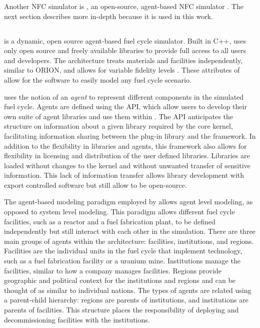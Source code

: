 Another \gls{NFC} simulator is \Cyclus, an open-source, agent-based 
\gls{NFC} simulator \cite{huff_fundamental_2016}. The next section 
describes \Cyclus more in-depth because it is used in this work.  

\subsection{\Cyclus}
\Cyclus is a dynamic, open source agent-based fuel cycle simulator. Built 
in C++, \Cyclus uses only open source and freely available libraries to 
provide full access to all users and developers. The 
\Cyclus architecture treats materials and facilities independently, similar 
to ORION, and allows 
for variable fidelity levels \cite{huff_fundamental_2016}. These attributes
of \Cyclus allow for the software to easily model any fuel cycle scenario.

\Cyclus uses the notion of an \textit{agent} to represent different 
components in the simulated fuel cycle. Agents are 
defined using the \Cyclus \gls{API}, which allow 
users 
to develop their own suite of agent libraries and use them within \Cyclus. 
The \gls{API} anticipates the structure on information about a given 
library 
required by the core \Cyclus kernel, facilitating 
information sharing between the plug-in library and the \Cyclus framework. 
In addition to the flexibility in libraries and agents, this framework 
also allows for flexibility in licensing and distribution of the user 
defined libraries. Libraries are loaded without changes to the \Cyclus 
kernel and without unwanted transfer of sensitive information. This lack 
of information transfer allows library development with export controlled 
software but still allow \Cyclus to be open-source.

The agent-based modeling paradigm employed by \Cyclus allows agent level 
modeling, as opposed to system level modeling. This paradigm allows different 
fuel cycle facilities, such as a reactor and a fuel fabrication plant, to 
be defined independently but still interact with each other in the 
simulation. There are three main groups of agents within the \Cyclus 
architecture: facilities, institutions, and regions. Facilities are 
the individual units in the fuel cycle that implement technology, 
such as a fuel fabrication facility or a uranium mine. Institutions 
manage the facilities, similar to how a company manages facilities. 
Regions provide geographic 
and political context for the institutions and regions and can be thought 
of as similar to individual nations. The types of agents are related using 
a parent-child hierarchy: regions are
parents of institutions, and institutions are parents of facilities. This 
structure places the responsibility of deploying and decommissioning 
facilities with the institutions. 

